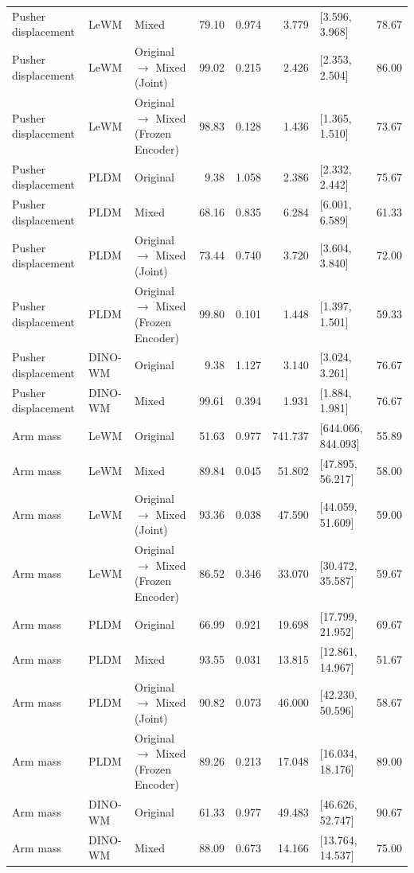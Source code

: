 \begin{longtable}{@{}p{1.8cm}lp{3.65cm}rrrp{2.5cm}r@{}}
Pusher displacement & LeWM & Mixed & 79.10 & 0.974 & 3.779 & [3.596, 3.968] & 78.67 \\
Pusher displacement & LeWM & Original $\rightarrow$ Mixed (Joint) & 99.02 & 0.215 & 2.426 & [2.353, 2.504] & 86.00 \\
Pusher displacement & LeWM & Original $\rightarrow$ Mixed (Frozen Encoder) & 98.83 & 0.128 & 1.436 & [1.365, 1.510] & 73.67 \\
Pusher displacement & PLDM & Original & 9.38 & 1.058 & 2.386 & [2.332, 2.442] & 75.67 \\
Pusher displacement & PLDM & Mixed & 68.16 & 0.835 & 6.284 & [6.001, 6.589] & 61.33 \\
Pusher displacement & PLDM & Original $\rightarrow$ Mixed (Joint) & 73.44 & 0.740 & 3.720 & [3.604, 3.840] & 72.00 \\
Pusher displacement & PLDM & Original $\rightarrow$ Mixed (Frozen Encoder) & 99.80 & 0.101 & 1.448 & [1.397, 1.501] & 59.33 \\
Pusher displacement & DINO-WM & Original & 9.38 & 1.127 & 3.140 & [3.024, 3.261] & 76.67 \\
Pusher displacement & DINO-WM & Mixed & 99.61 & 0.394 & 1.931 & [1.884, 1.981] & 76.67 \\
\midrule
Arm mass & LeWM & Original & 51.63 & 0.977 & 741.737 & [644.066, 844.093] & 55.89 \\
Arm mass & LeWM & Mixed & 89.84 & 0.045 & 51.802 & [47.895, 56.217] & 58.00 \\
Arm mass & LeWM & Original $\rightarrow$ Mixed (Joint) & 93.36 & 0.038 & 47.590 & [44.059, 51.609] & 59.00 \\
Arm mass & LeWM & Original $\rightarrow$ Mixed (Frozen Encoder) & 86.52 & 0.346 & 33.070 & [30.472, 35.587] & 59.67 \\
Arm mass & PLDM & Original & 66.99 & 0.921 & 19.698 & [17.799, 21.952] & 69.67 \\
Arm mass & PLDM & Mixed & 93.55 & 0.031 & 13.815 & [12.861, 14.967] & 51.67 \\
Arm mass & PLDM & Original $\rightarrow$ Mixed (Joint) & 90.82 & 0.073 & 46.000 & [42.230, 50.596] & 58.67 \\
Arm mass & PLDM & Original $\rightarrow$ Mixed (Frozen Encoder) & 89.26 & 0.213 & 17.048 & [16.034, 18.176] & 89.00 \\
Arm mass & DINO-WM & Original & 61.33 & 0.977 & 49.483 & [46.626, 52.747] & 90.67 \\
Arm mass & DINO-WM & Mixed & 88.09 & 0.673 & 14.166 & [13.764, 14.537] & 75.00 \\

\end{longtable}
